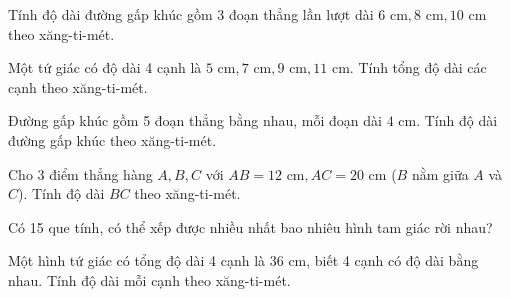 \begin{ex} %
Tính độ dài đường gấp khúc gồm 3 đoạn thẳng lần lượt dài $6\text{ cm}, 8\text{ cm}, 10\text{ cm}$ theo xăng-ti-mét.
\end{ex}

\begin{ex} %
Một tứ giác có độ dài 4 cạnh là $5\text{ cm}, 7\text{ cm}, 9\text{ cm}, 11\text{ cm}$. Tính tổng độ dài các cạnh theo xăng-ti-mét.
\end{ex}

\begin{ex} %
Đường gấp khúc gồm 5 đoạn thẳng bằng nhau, mỗi đoạn dài $4\text{ cm}$. Tính độ dài đường gấp khúc theo xăng-ti-mét.
\end{ex}

\begin{ex} %
Cho 3 điểm thẳng hàng $A, B, C$ với $AB = 12\text{ cm}, AC = 20\text{ cm}$ ($B$ nằm giữa $A$ và $C$). Tính độ dài $BC$ theo xăng-ti-mét.
\end{ex}

\begin{ex} %
Có 15 que tính, có thể xếp được nhiều nhất bao nhiêu hình tam giác rời nhau?
\end{ex}

\begin{ex} %
Một hình tứ giác có tổng độ dài 4 cạnh là $36\text{ cm}$, biết 4 cạnh có độ dài bằng nhau. Tính độ dài mỗi cạnh theo xăng-ti-mét.
\end{ex}
